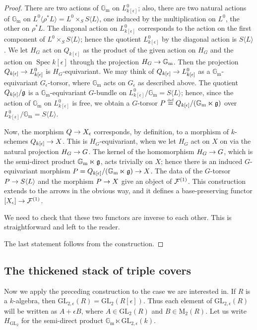 \documentclass{amsart}
\numberwithin{equation}{section}
\numberwithin{subsection}{section}
\theoremstyle{definition}
\theoremstyle{remark}
\newcommand\rM{\mathrm{M}} \newcommand\rN{\mathrm{N}}
\newcommand\arr{\ifinner\to\else\longrightarrow\fi}
\newcommand\eqdef{\overset{\mathrm{\scriptscriptstyle def}} =}
\newcommand\spec{\operatorname{Spec}}
\newcommand\generate[1]{\langle #1 \rangle}
\newcommand{\GL}{\mathrm{GL}}
\newcommand{\gm}{\mathbb{G}_{\mathrm{m}}}
\newcommand{\GLe}{\GL_{2, \epsilon}}
\newcommand\Hg{H_{\GL_2}}
\begin{document}
\begin{proof}
There are two actions of $\gm$ on $L^{0}_{k[\epsilon]}$; also, there are two natural actions of $\gm$ on $L^{0}\generate{\rho^{*}L} = L^{0}\times_{S}S\generate{L}$, one induced by the multiplication on $L^{0}$, the other on $\rho^{*}L$. The diagonal action on $L^{0}_{k[\epsilon]}$ corresponds to the action on the first component of $L^{0}\times_{S}S\generate{L}$; hence the quotient $L^{0}_{k[\epsilon]}$ by the diagonal action is $S\generate{L}$. We let $H_G$ act on $Q_{k[\epsilon]}$ as the product of the given action on $H_G$ and the action on $\spec k[\epsilon]$ through the projection $H_G \arr \gm$. Then the projection $Q_{k[\epsilon]} \arr L^{0}_{k[\epsilon]}$ is $H_G$-equivariant. We may think of $Q_{k[\epsilon]} \arr L^{0}_{k[\epsilon]}$ as a $\gm$-equivariant $G_{\epsilon}$-torsor, where $\gm$ acts on $G_{\epsilon}$ as described above. The quotient $Q_{k[\epsilon]}/\mathfrak{g}$ is a $\gm$-equivariant $G$-bundle on $L^{0}_{k[\epsilon]}/\gm = S\generate{L}$; hence, since the action of $\gm$ on $L^{0}_{k[\epsilon]}$ is free, we obtain a $G$-torsor $P \eqdef Q_{k[\epsilon]}/(\gm\ltimes \frg)$ over $L^{0}_{k[\epsilon]}/\gm = S\generate{L}$.

Now, the morphism $Q \arr X_{\epsilon}$ corresponds, by definition, to a morphism of $k$-schemes $Q_{k[\epsilon]} \arr X$. This is $H_G$-equivariant, when we let $H_G$ act on $X$ on via the natural projection $H_G \arr G$. The kernel of the homomorphism $H_G \arr G$, which is the semi-direct product $\gm \ltimes \frg$, acts trivially on $X$; hence there is an induced $G$-equivariant morphism $P = Q_{k[\epsilon]}/(\gm\ltimes \frg) \arr X$. The data of the $G$-torsor $P \arr S\generate{L}$ and the morphism $P \arr X$ give an object of $\mathcal{F}^{(1)}$. This construction extends to the arrows in the obvious way, and it defines a base-preserving functor $[X_{\epsilon}] \arr \cF^{(1)}$.

We need to check that these two functors are inverse to each other. This is straightforward and left to the reader.

The last statement follows from the construction.
\end{proof}


\subsection{The thickened stack of triple covers}\label{subsec:thickened-triple} Now we apply the preceding construction to the case we are interested in. If $R$ is a $k$-algebra, then $\GLe(R) = \GL_{2}(R[\epsilon])$. Thus each element of $\GLe(R)$ will be written as $A + \epsilon B$, where $A \in \GL_{2}(R)$ and $B \in \rM_{2}(R)$. Let us write $\Hg$ for the semi-direct product $\gm \ltimes \GLe(k)$.
\end{document}
